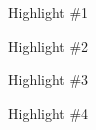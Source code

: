 \begin{highlights}

\item Highlight \#1

\item Highlight \#2

\item Highlight \#3

\item Highlight \#4

\end{highlights}

